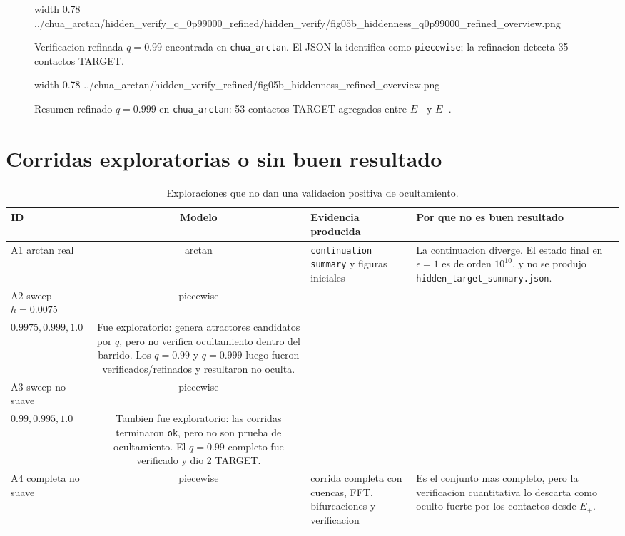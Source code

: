\documentclass[11pt]{article}
\newcommand{\img}[2]{%
  \begingroup
  \pdfximage width #1 {#2}%
  \pdfrefximage\pdflastximage
  \endgroup
}
\newcommand{\pathcell}[1]{\texttt{\footnotesize #1}}
\newcommand{\bad}{\textcolor{red!65!black}{no oculta}}
\begin{document}
\begin{figure}[H]
\centering
\img{0.78\textwidth}{../chua_arctan/hidden_verify_q_0p99000_refined/hidden_verify/fig05b_hiddenness_q0p99000_refined_overview.png}
\caption{Verificacion refinada \(q=0.99\) encontrada en \pathcell{chua\_arctan}. El JSON la identifica como \pathcell{piecewise}; la refinacion detecta 35 contactos TARGET.}
\end{figure}

\begin{figure}[H]
\centering
\img{0.78\textwidth}{../chua_arctan/hidden_verify_refined/fig05b_hiddenness_refined_overview.png}
\caption{Resumen refinado \(q=0.999\) en \pathcell{chua\_arctan}: 53 contactos TARGET agregados entre \(E_+\) y \(E_-\).}
\end{figure}

\section*{Corridas exploratorias o sin buen resultado}

\begin{table}[H]
\centering
\caption{Exploraciones que no dan una validacion positiva de ocultamiento.}
\scriptsize
\begin{tabularx}{\textwidth}{>{\raggedright\arraybackslash}p{2.8cm}c>{\raggedright\arraybackslash}p{3.0cm}X}
\toprule
ID & Modelo & Evidencia producida & Por que no es buen resultado \\
\midrule
A1 arctan real &
arctan &
\pathcell{continuation summary} y figuras iniciales &
La continuacion diverge. El estado final en \(\epsilon=1\) es de orden
\(10^{10}\), y no se produjo \pathcell{hidden\_target\_summary.json}. \\
A2 sweep \(h=0.0075\) &
piecewise &
\begin{tabular}[t]{@{}l@{}}barrido \(q=0.99,0.995\)\\\(0.9975,0.999,1.0\)\end{tabular} &
Fue exploratorio: genera atractores candidatos por \(q\), pero no verifica
ocultamiento dentro del barrido. Los \(q=0.99\) y \(q=0.999\) luego fueron
verificados/refinados y resultaron \bad. \\
A3 sweep no suave &
piecewise &
\begin{tabular}[t]{@{}l@{}}barrido \(q=0.97,0.98,0.985\)\\\(0.99,0.995,1.0\)\end{tabular} &
Tambien fue exploratorio: las corridas terminaron \pathcell{ok}, pero no son
prueba de ocultamiento. El \(q=0.99\) completo fue verificado y dio 2 TARGET. \\
A4 completa no suave &
piecewise &
corrida completa con cuencas, FFT, bifurcaciones y verificacion &
Es el conjunto mas completo, pero la verificacion cuantitativa lo descarta como
oculto fuerte por los contactos desde \(E_+\). \\
\bottomrule
\end{tabularx}
\end{table}
\end{document}
